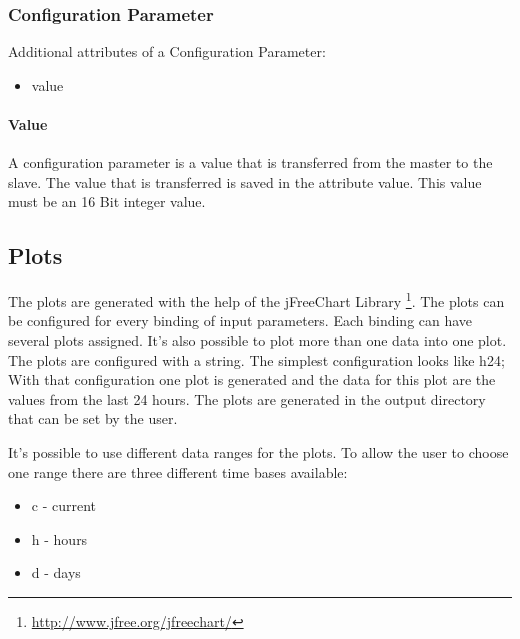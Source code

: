 \subsubsection{Configuration Parameter} %
\label{ssub:configuration_parameter}
Additional attributes of a Configuration Parameter:
\begin{itemize}
    \item value
\end{itemize}

\paragraph{Value} %
\label{par:value}
A configuration parameter is a value that is transferred from the master to the slave. The value that is transferred is saved in the attribute value. This value must be an 16 Bit integer value.


\subsection{Plots} %
\label{sub:plots}
The plots are generated with the help of the jFreeChart Library \footnote{\url{http://www.jfree.org/jfreechart/}}.
The plots can be configured for every binding of input parameters. Each binding can have several plots assigned. It's also possible to plot more than one data into one plot. The plots are configured with a string. The simplest configuration looks like {\C h24;} With that configuration one plot is generated and the data for this plot are the values from the last 24 hours. The plots are generated in the output directory that can be set by the user.

It's possible to use different data ranges for the plots. To allow the user to choose one range there are three different time bases available:
\begin{itemize}
	\item c - current
	\item h - hours
	\item d - days
\end{itemize}

